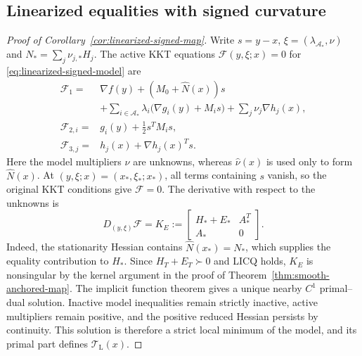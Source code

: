 \documentclass[pdflatex,sn-mathphys-num]{sn-jnl}
\theoremstyle{thmstyleone}
\theoremstyle{thmstylethree}
\begin{document}
\subsection{Linearized equalities with signed curvature}
\label{supp:linearized-signed-proof}
\begin{proof}[Proof of Corollary~\ref{cor:linearized-signed-map}]
Write $s=y-x$, $\xi=(\lambda_{\mathcal A_*},\nu)$ and
$N_*=\sum_j\nu_{j,*}H_j$. The active KKT equations
$\mathcal F(y,\xi;x)=0$ for \eqref{eq:linearized-signed-model} are
\begin{align*}
 \mathcal F_1={}&\nabla f(y)+(M_0+\widehat N(x))s\\
 &+\sum_{i\in\mathcal A_*}\lambda_i
           \bigl(\nabla g_i(y)+M_is\bigr)
   +\sum_j\nu_j\nabla h_j(x),\\
 \mathcal F_{2,i}={}&g_i(y)+\tfrac12s^TM_is,\\
 \mathcal F_{3,j}={}&h_j(x)+\nabla h_j(x)^Ts.
\end{align*}
Here the model multipliers $\nu$ are unknowns, whereas
$\widehat\nu(x)$ is used only to form $\widehat N(x)$.
At $(y,\xi;x)=(x_*,\xi_*;x_*)$, all terms containing $s$ vanish,
so the original KKT conditions give $\mathcal F=0$. The derivative
with respect to the unknowns is
\[
 D_{(y,\xi)}\mathcal F
 =K_E:=\begin{bmatrix}H_*+E_*&A_*^T\\A_*&0\end{bmatrix}.
\]
Indeed, the stationarity Hessian contains $\widehat N(x_*)=N_*$,
which supplies the equality contribution to $H_*$. Since
$H_T+E_T\succ0$ and LICQ holds, $K_E$ is nonsingular by the
kernel argument in the proof of Theorem~\ref{thm:smooth-anchored-map}.
The implicit function theorem gives a unique nearby $C^1$
primal--dual solution. Inactive model inequalities remain strictly
inactive, active multipliers remain positive, and the positive reduced
Hessian persists by continuity. This solution is therefore a strict
local minimum of the model, and its primal part defines
$\mathcal T_{\mathrm L}(x)$.


\end{proof}
\end{document}
